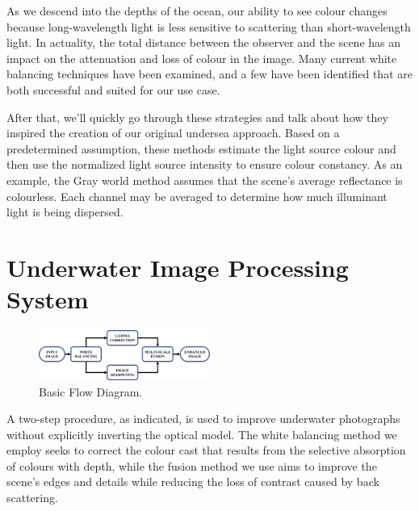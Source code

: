\documentclass[conference]{IEEEtran}
\begin{document}
\par
As we descend into the depths of the ocean, our ability to see colour changes because long-wavelength light is less sensitive to scattering than short-wavelength light. In actuality, the total distance between the observer and the scene has an impact on the attenuation and loss of colour in the image. Many current white balancing techniques have been examined, and a few have been identified that are both successful and suited for our use case.\\ 
\par
After that, we'll quickly go through these strategies and talk about how they inspired the creation of our original undersea approach. Based on a predetermined assumption, these methods estimate the light source colour and then use the normalized light source intensity to ensure colour constancy. As an example, the Gray world method \cite{key:article} assumes that the scene's average reflectance is colourless. Each channel may be averaged to determine how much illuminant light is being dispersed. 

\section{Underwater Image Processing System}

\begin{figure}
\includegraphics[width=0.5\textwidth]{2_Basic Flow Diagram.png}
\caption{Basic Flow Diagram.}
\end{figure}

A two-step procedure, as indicated, is used to improve underwater photographs without explicitly inverting the optical model. The white balancing method we employ seeks to correct the colour cast that results from the selective absorption of colours with depth, while the fusion method we use aims to improve the scene's edges and details while reducing the loss of contrast caused by back scattering. \\
\end{document}
